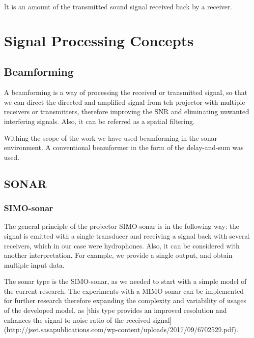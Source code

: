 It is an amount of the transmitted sound signal received back by a receiver.


\section{Signal Processing Concepts}
    
\subsection{Beamforming}

A beamforming is a way of processing the received or transmitted signal, so that we can direct the directed and amplified signal from teh projector with multiple receivers or transmitters, therefore improving the SNR and eliminating unwanted interfering signals. Also, it can be referred as a spatial filtering.

Withing the scope of the work we have used beamforming in the sonar environment. A conventional beamformer in the form of the delay-and-sum was used. 

\subsection{SONAR}

\subsubsection{SIMO-sonar}

The general principle of the projector SIMO-sonar is in the following way:  the signal is emitted with a single transducer and receiving a signal back with several receivers, which in our case were hydrophones. Also, it can be considered with another interpretation. For example, we provide a single output, and obtain multiple input data.
    
The sonar type is the SIMO-sonar, as we needed to start with a simple model of the current research. The experiments with a MIMO-sonar can be implemented for further research therefore expanding the complexity and variability of usages of the developed model, as [this type provides an improved resolution and enhances the signal-to-noise ratio of the received signal] (http://jset.sasapublications.com/wp-content/uploads/2017/09/6702529.pdf).
    
